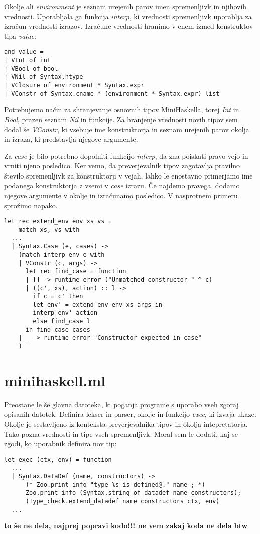 \documentclass[12pt,a4paper,openany]{book}
\begin{document}
Okolje ali \emph{environment} je seznam urejenih parov imen spremenljivk in njihovih vrednosti. Uporabljala ga funkcija \emph{interp}, ki vrednosti spremenljivk uporablja za izračun 
vrednosti izrazov. Izračune vrednosti hranimo v enem izmed konstruktov tipa \emph{value}: 
\begin{lstlisting}
and value =
| VInt of int
| VBool of bool
| VNil of Syntax.htype
| VClosure of environment * Syntax.expr
| VConstr of Syntax.cname * (environment * Syntax.expr) list
\end{lstlisting}
Potrebujemo način za shranjevanje osnovnih tipov MiniHaskella, torej \emph{Int} in \emph{Bool}, prazen seznam \emph{Nil} in funkcije. Za hranjenje vrednosti novih tipov sem dodal še 
\emph{VConstr}, ki vsebuje ime konstruktorja in seznam urejenih parov okolja in izraza, ki predstavlja njegove argumente. 

Za \emph{case} je bilo potrebno dopolniti funkcijo \emph{interp}, da zna poiskati pravo vejo in vrniti njeno posledico. Ker vemo, da preverjevalnik tipov zagotavlja pravilno število 
spremenljivk za konstruktorji v vejah, lahko le enostavno primerjamo ime podanega konstruktorja z vsemi v \emph{case} izrazu. Če najdemo pravega, dodamo njegove argumente v okolje in 
izračunamo posledico. V nasprotnem primeru sprožimo napako. 
\begin{lstlisting}
let rec extend_env env xs vs =
    match xs, vs with
  ...
  | Syntax.Case (e, cases) ->
    (match interp env e with
    | VConstr (c, args) ->
      let rec find_case = function
      | [] -> runtime_error ("Unmatched constructor " ^ c)
      | ((c', xs), action) :: l ->
        if c = c' then
        let env' = extend_env env xs args in
        interp env' action
        else find_case l
      in find_case cases
    | _ -> runtime_error "Constructor expected in case"
    )
\end{lstlisting}

\section{minihaskell.ml}
Preostane le še glavna datoteka, ki poganja programe s uporabo vseh zgoraj opisanih datotek. Definira lekser in parser, okolje in funkcijo \emph{exec}, ki izvaja ukaze. Okolje je sestavljeno 
iz konteksta preverjevalnika tipov in okolja intepretatorja. Tako pozna vrednosti in tipe vseh spremenljivk. Moral sem le dodati, kaj se zgodi, ko uporabnik definira nov tip:
\begin{lstlisting}
let exec (ctx, env) = function
  ...
  | Syntax.DataDef (name, constructors) ->
      (* Zoo.print_info "type %s is defined@." name ; *)
      Zoo.print_info (Syntax.string_of_datadef name constructors);
      (Type_check.extend_datadef name constructors ctx, env)
  ...
\end{lstlisting}
\textbf{to še ne dela, najprej popravi kodo!!! ne vem zakaj koda ne dela btw}
\end{document}
